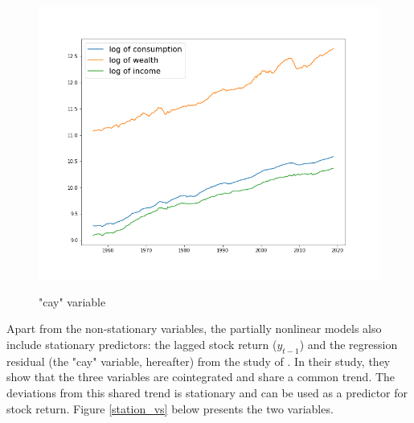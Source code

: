\documentclass[a4paper,12pt,times,numbered,print,index]{report}
\numberwithin{equation}{section}
\begin{document}
\begin{figure}[!htbp]
	\centering
	\caption{"cay" variable}
	\includegraphics[width=0.5\linewidth]{plots/cay.png}
	\label{cay}
\end{figure}

Apart from the non-stationary variables, the partially nonlinear models also include stationary predictors: the lagged stock return ($y_{t-1}$) and the regression residual (the "cay" variable, hereafter) from the study of \cite{lettau2001consumption}. In their study, they show that the three variables are cointegrated and share a common trend. The deviations from this shared trend is stationary and can be used as a predictor for stock return. Figure \ref{station_vs} below presents the two variables. 
\end{document}
